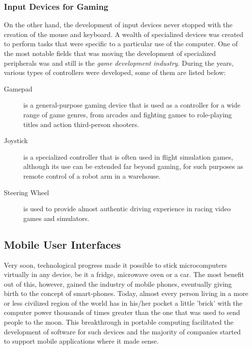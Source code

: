 \subsubsection{Input Devices for Gaming}

On the other hand, the development of input devices never stopped with the
creation of the mouse and keyboard. A wealth of specialized devices was
created to perform tasks that were specific to a particular use of the
computer. One of the most notable fields that was moving the development of
specialized peripherals was and still is the \emph{game development industry}.
During the years, various types of controllers were developed, some of them
are listed below:

\begin{description}

	\item [Gamepad] is a general-purpose gaming device that is used as a
		controller for a wide range of game genres, from arcades and fighting
		games to role-playing titles and action third-person shooters.

	\item [Joystick] is a specialized controller that is often used in flight
		simulation games, although its use can be extended far beyond gaming, for such
		purposes as remote control of a robot arm in a warehouse.

	\item [Steering Wheel] is used to provide almost authentic driving
		experience in racing video games and simulators. \end{description}



\subsection{Mobile User Interfaces}

Very soon, technological progress made it possible to stick microcomputers
virtually in any device, be it a fridge, microwave oven or a car. The most
benefit out of this, however, gained the industry of mobile phones, eventually
giving birth to the concept of smart-phones. Today, almost every person living
in a more or less civilized region of the world has in his/her pocket a little
'brick' with the computer power thousands of times greater than the one that
was used to send people to the moon. This breakthrough in portable computing
facilitated the development of software for such devices and the majority of
companies started to support mobile applications where it made sense.

